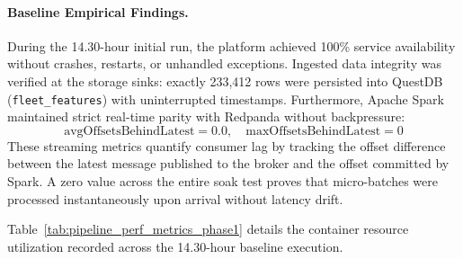 \paragraph{Baseline Empirical Findings.}
During the 14.30-hour initial run, the platform achieved 100\% service availability without crashes, restarts, or unhandled exceptions. Ingested data integrity was verified at the storage sinks: exactly 233,412 rows were persisted into QuestDB (\texttt{fleet\_features}) with uninterrupted timestamps. Furthermore, Apache Spark maintained strict real-time parity with Redpanda without backpressure:
\begin{equation}
    \text{avgOffsetsBehindLatest} = 0.0, \quad \text{maxOffsetsBehindLatest} = 0
\end{equation}
These streaming metrics quantify consumer lag by tracking the offset difference between the latest message published to the broker and the offset committed by Spark. A zero value across the entire soak test proves that micro-batches were processed instantaneously upon arrival without latency drift.

Table~\ref{tab:pipeline_perf_metrics_phase1} details the container resource utilization recorded across the 14.30-hour baseline execution.

